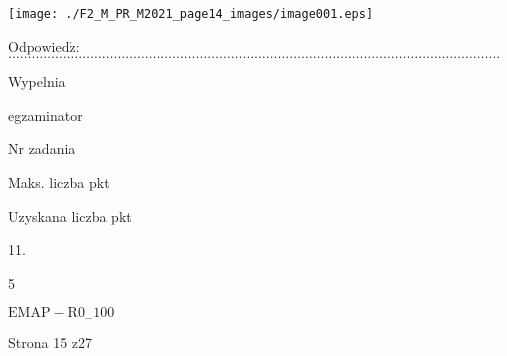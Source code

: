 \documentclass[a4paper,12pt]{article}
\begin{document}
\begin{center}
\texttt{[image: ./F2\_M\_PR\_M2021\_page14\_images/image001.eps]}
\end{center}
$\mathrm{O}\mathrm{d}\mathrm{p}\mathrm{o}\mathrm{w}\mathrm{i}\mathrm{e}\mathrm{d}\acute{\mathrm{z}}$:$\ldots\ldots\ldots\ldots\ldots\ldots\ldots\ldots\ldots\ldots\ldots\ldots\ldots\ldots\ldots\ldots\ldots\ldots\ldots\ldots\ldots\ldots\ldots\ldots\ldots\ldots\ldots\ldots\ldots\ldots\ldots\ldots\ldots\ldots\ldots\ldots\ldots\ldots\ldots\ldots\ldots\ldots$

Wypelnia

egzaminator

Nr zadania

Maks. liczba pkt

Uzyskana liczba pkt

11.

5

$\mathrm{E}\mathrm{M}\mathrm{A}\mathrm{P}-\mathrm{R}0_{-}100$

Strona 15 z27
\end{document}
